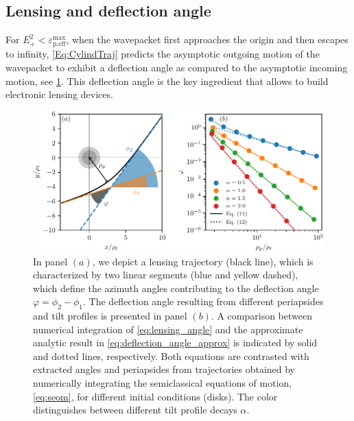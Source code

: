 \documentclass[submission, Phys]{SciPost}
\begin{document}
\subsection{Lensing and deflection angle}
For $E_+^2< {\varepsilon}_{\text{p,eff}}^{\text{max}}$, when the wavepacket first approaches the origin and then escapes to infinity, \cref{Eq:CylindTraj} predicts the asymptotic outgoing motion of the wavepacket to exhibit a deflection angle as compared to the asymptotic incoming motion, see \cref{fig:deflection_angle}. This deflection angle is the key ingredient that allows to build electronic lensing devices.

\begin{figure}[ht]
    \centering
    \includegraphics[width=\textwidth]{fig/deflection_angle.pdf}
    \caption{In panel $(a)$, we depict a lensing trajectory (black line), which is characterized by two linear segments (blue and yellow dashed), which define the azimuth angles contributing to the deflection angle $\varphi = \phi_2 - \phi_1$. The deflection angle resulting from different periapsides and tilt profiles is presented in panel $(b)$. A comparison between numerical integration of \cref{eq:lensing_angle} and the approximate analytic result in \cref{eq:deflection_angle_approx} is indicated by solid and dotted lines, respectively. Both equations are contrasted with extracted angles and periapsides from trajectories obtained by numerically integrating the semiclassical equations of motion, \cref{eq:seom}, for different initial conditions (disks). The color distinguishes between different tilt profile decays $\alpha$. }
    \label{fig:deflection_angle}
\end{figure}
\end{document}
